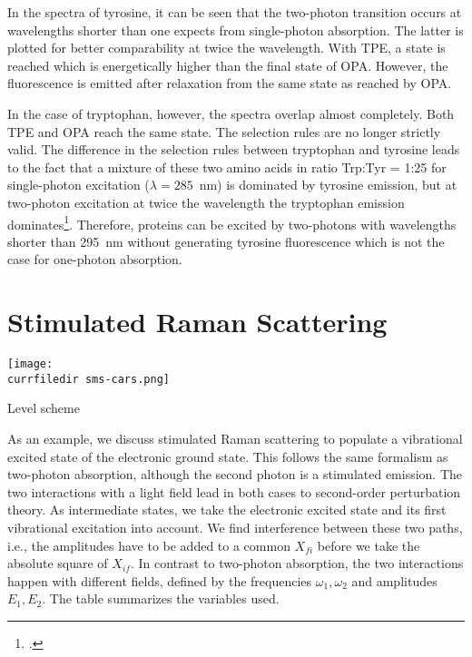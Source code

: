 In the spectra of tyrosine, it can be seen that the
two-photon transition occurs at wavelengths shorter than one expects from 
 single-photon absorption. The latter is plotted for better
comparability at twice the wavelength. With
TPE, a state is reached which is energetically higher than the final state of   OPA. However, the fluorescence is emitted after relaxation from the same state as reached by OPA.


In the case of tryptophan, however, the spectra overlap almost 
completely. Both  TPE and  OPA reach the same state.
The selection rules are no longer strictly valid. The
difference in the selection rules between tryptophan and tyrosine
leads to the fact that a mixture of these two amino acids in
ratio Trp:Tyr = 1:25 for single-photon excitation ($\lambda =
285$~nm) is dominated by tyrosine emission,  but at
two-photon excitation at twice the wavelength  the
tryptophan emission dominates\footcite{kierdaszuk95}. Therefore, proteins can be excited by two-photons with  wavelengths shorter than 295~nm
without generating tyrosine fluorescence which is not the case for one-photon absorption.





\section{Stimulated Raman Scattering}


\begin{marginfigure}
\texttt{[image: \\currfiledir sms-cars.png]}
\caption{ Level scheme }
\end{marginfigure}


As an example, we discuss stimulated Raman scattering to populate a vibrational excited state of the electronic ground state. This follows the same formalism as two-photon absorption, although the second photon is a stimulated emission. The two interactions with a light field lead in both cases to second-order perturbation theory. As intermediate states, we take the electronic excited state and its first vibrational excitation into account. We find interference between these two paths, i.e., the amplitudes have to be added to a common $X_{fi}$ before we take the absolute square of $X_{if}$. In contrast to two-photon absorption, the two interactions happen with   different fields, defined by the frequencies $\omega_1,\omega_2$ and amplitudes $E_1, E_2$. The table summarizes the variables used.

